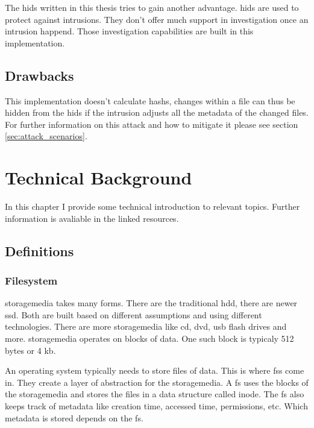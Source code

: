 \documentclass[
	a4paper,					%
	10pt,							%
	twoside,					%
	openright,				%
	notitlepage,			%
	parskip=half,			%
]{scrreprt}					%
\begin{document}
The \gls{hids} written in this thesis tries to gain another advantage. \gls{hids} are used to protect against \glspl{intrusion}. They don't offer much support in \gls{investigation} once an \gls{intrusion} happend. Those \gls{investigation} capabilities are built in this implementation. 

\section{Drawbacks}

This implementation doesn't calculate \glspl{hash}, changes within a file can thus be hidden from the \gls{hids} if the intrusion adjusts all the \gls{metadata} of the changed files. For further information on this attack and how to mitigate it please see section \ref{sec:attack_scenarios}.

\chapter{Technical Background}

In this chapter I provide some technical introduction to relevant topics. Further information is avaliable in the linked resources.

\section{Definitions}

\subsection{Filesystem}
\label{sec:fs}

\gls{storagemedia} takes many forms. There are the traditional \gls{hdd}, there are newer \gls{ssd}. Both are built based on different assumptions and using different technologies. There are more \gls{storagemedia} like \gls{cd}, \gls{dvd}, \gls{usb} flash drives and more. \gls{storagemedia} operates on blocks of data. One such block is typicaly 512 bytes or 4 \gls{kb}. \cite{bruce:imaging}

An operating system typically needs to store files of data. This is where \glspl{fs} come in. They create a layer of abstraction for the \gls{storagemedia}. A \gls{fs} uses the blocks of the \gls{storagemedia} and stores the files in a data structure called inode. \cite{inode} The \gls{fs} also keeps track of \gls{metadata} like creation time, accessed time, permissions, etc. Which \gls{metadata} is stored depends on the \gls{fs}. \cite{bruce:imaging}
\end{document}
